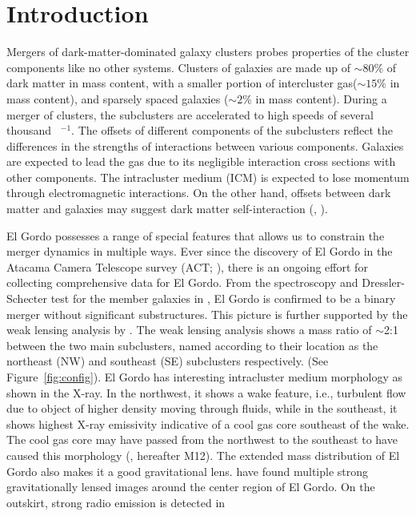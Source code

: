 \section{Introduction} 
Mergers of dark-matter-dominated galaxy clusters probes properties
of the cluster components like no other systems. 
Clusters of galaxies are made up of $\sim80\%$ of dark matter in mass content, 
with a smaller  portion of intercluster gas($\sim15\%$ in mass content), and
sparsely spaced galaxies ($\sim2\%$ in mass content). During a merger of
clusters, the subclusters are accelerated to high speeds of several
thousand \kilo \meter~\second$^{-1}$. The offsets of
different components of the subclusters reflect the differences in the
strengths of interactions between various components. Galaxies are
expected to lead the gas due to its negligible interaction cross
sections with other components. The intracluster medium (ICM) is expected to lose
momentum through electromagnetic interactions. On the other hand, offsets
between dark matter and galaxies may suggest dark matter self-interaction
(\citealt{Kahlhoefer14}, \citealt{Randall2008d}).  
\par
El Gordo possesses a range of special features that allows us to constrain
the merger dynamics in multiple ways.  Ever since the discovery of El Gordo
in the Atacama Camera Telescope survey (ACT; \citealt{Marriage11}), there is an ongoing effort for
collecting comprehensive data for El Gordo.
From the spectroscopy and Dressler-Schecter test for the member galaxies
in \cite{Sifon13}, El Gordo is confirmed to be a binary merger 
without significant substructures. This picture is further supported by the
weak lensing analysis by \cite{Jee13}. The weak lensing analysis shows
a mass ratio of $\sim$2:1  between the two main subclusters, named according to their location as the northeast (NW) and southeast (SE) subclusters respectively. 
(See Figure~\ref{fig:config}). El Gordo has interesting intracluster medium morphology as shown in the X-ray. In the northwest, it shows a wake feature, i.e.,
turbulent flow due to object of higher density moving through fluids, while in the southeast, it shows
highest X-ray emissivity indicative of a cool gas core southeast of the
wake. The cool gas core may have passed from the northwest to the southeast
to have caused this morphology (\citealt{M12}, hereafter M12). 
The extended mass distribution of El Gordo also makes it a good
gravitational lens. \cite{Zitrin13} have found multiple strong
gravitationally lensed images around the center region of El Gordo. 
On the outskirt, strong radio emission is detected in
